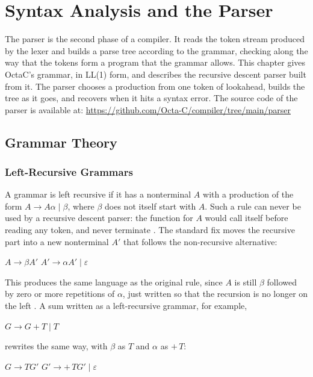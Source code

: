 
\chapter{Syntax Analysis and the Parser}
\label{chp:parser}

The parser is the second phase of a compiler. It reads the token stream
produced by the lexer and builds a parse tree according to the grammar,
checking along the way that the tokens form a program that the grammar
allows. This chapter gives OctaC's grammar, in LL(1) form, and describes
the recursive descent parser built from it. The parser
chooses a production from one token of lookahead, builds the tree as it
goes, and recovers when it hits a syntax error. The source code of the
parser is available at:
\url{https://github.com/Octa-C/compiler/tree/main/parser}

\section{Grammar Theory}
\label{sec:grammar-theory}

\subsection{Left-Recursive Grammars}

A grammar is left recursive if it has a nonterminal $A$ with a production
of the form $A \to A\alpha \mid \beta$, where $\beta$ does not itself start
with $A$. Such a rule can never be used by a recursive descent parser: the
function for $A$ would call itself before reading any token, and never
terminate \cite{aho2006compilers}. The standard fix moves the recursive
part into a new nonterminal $A'$ that follows the non-recursive
alternative:
\begin{center}
$A \to \beta A'$ \qquad $A' \to \alpha A' \mid \varepsilon$
\end{center}
This produces the same language as the original rule, since $A$ is still
$\beta$ followed by zero or more repetitions of $\alpha$, just written so
that the recursion is no longer on the left \cite{aho2006compilers}. A sum
written as a left-recursive grammar, for example,
\begin{center}
$G \to G \mathbin{+} T \mid T$
\end{center}
rewrites the same way, with $\beta$ as $T$ and $\alpha$ as $\mathbin{+}\, T$:
\begin{center}
$G \to T G'$ \qquad $G' \to \mathbin{+}\, T G' \mid \varepsilon$
\end{center}


